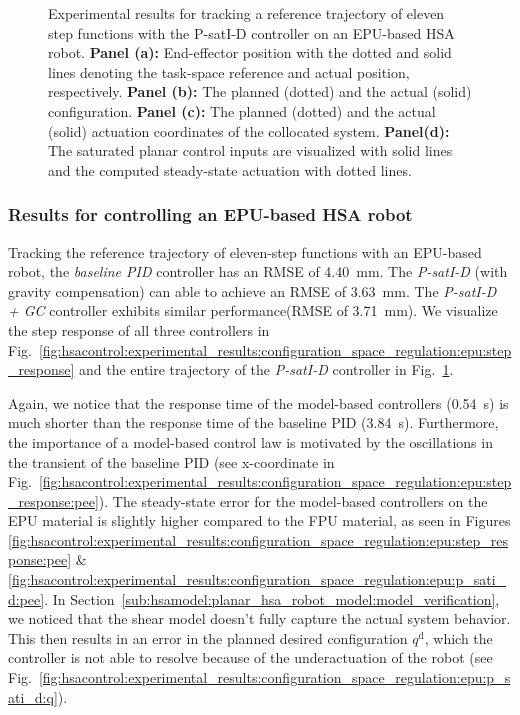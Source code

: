 \begin{figure}[ht]
    \caption{Experimental results for tracking a reference trajectory of eleven step functions with the P-satI-D controller on an EPU-based HSA robot. \textbf{Panel (a):} End-effector position with the dotted and solid lines denoting the task-space reference and actual position, respectively.
    \textbf{Panel (b):} The planned (dotted) and the actual (solid) configuration. 
    \textbf{Panel (c):} The planned (dotted) and the actual (solid) actuation coordinates of the collocated system. 
    \textbf{Panel(d):} The saturated planar control inputs are visualized with solid lines and the computed steady-state actuation with dotted lines.}\label{fig:hsacontrol:experimental_results:configuration_space_regulation:epu:p_sati_d}
\end{figure}

\subsubsection{Results for controlling an EPU-based HSA robot}
Tracking the reference trajectory of eleven-step functions with an EPU-based robot, the \emph{baseline PID} controller has an \gls{RMSE} of \SI{4.40}{mm}. The \emph{P-satI-D} (with gravity compensation) can able to achieve an \gls{RMSE} of \SI{3.63}{mm}. The \emph{P-satI-D + GC} controller exhibits similar performance(\gls{RMSE} of \SI{3.71}{mm}).
We visualize the step response of all three controllers in Fig.~\ref{fig:hsacontrol:experimental_results:configuration_space_regulation:epu:step_response} and the entire trajectory of the \emph{P-satI-D} controller in Fig.~\ref{fig:hsacontrol:experimental_results:configuration_space_regulation:epu:p_sati_d}.

Again, we notice that the response time of the model-based controllers (\SI{0.54}{s}) is much shorter than the response time of the baseline PID (\SI{3.84}{s}). Furthermore, the importance of a model-based control law is motivated by the oscillations in the transient of the baseline PID (see x-coordinate in Fig.~\ref{fig:hsacontrol:experimental_results:configuration_space_regulation:epu:step_response:pee}).
The steady-state error for the model-based controllers on the EPU material is slightly higher compared to the FPU material, as seen in Figures \ref{fig:hsacontrol:experimental_results:configuration_space_regulation:epu:step_response:pee} \& \ref{fig:hsacontrol:experimental_results:configuration_space_regulation:epu:p_sati_d:pee}. In Section~\ref{sub:hsamodel:planar_hsa_robot_model:model_verification}, we noticed that the shear model doesn't fully capture the actual system behavior. This then results in an error in the planned desired configuration $q^\mathrm{d}$, which the controller is not able to resolve because of the underactuation of the robot (see Fig.~\ref{fig:hsacontrol:experimental_results:configuration_space_regulation:epu:p_sati_d:q}).